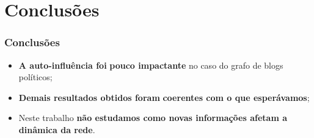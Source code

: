 
\section{Conclusões}

\begin{frame}
  \frametitle{Conclusões}

  \begin{alertblock}{}
    \vspace{5mm}

    \begin{itemize}
      \item \textbf{A auto-influência foi} \textbf{\alert{pouco impactante}}
        no caso do grafo de blogs políticos;
      \vspace{5mm}

      \item \textbf{Demais resultados obtidos foram} \textbf{\alert{coerentes
        com o que esperávamos}};
      \vspace{5mm}

      \item Neste trabalho \textbf{\alert{não estudamos como novas informações
        afetam a dinâmica da rede}}.
    \end{itemize}
    \vspace{5mm}

  \end{alertblock}
\end{frame}
